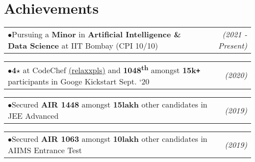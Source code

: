 \documentclass[a4paper,11pt]{article}
\makeatletter
\def\Plus{\texttt{+}}
\newcommand{\resumeSubheading}[4]{
  \vspace{-2pt}\item
    \begin{tabular*}{\textwidth}[t]{l@{\extracolsep{\fill}}r}
      \textbf{#1} & #2 \\
      \textit{\small#3} & \textit{\small #4} \\
    \end{tabular*}\vspace{-7pt}
}
\newcommand{\resumeSubHeadingListStart}{\begin{itemize}[leftmargin=-0pt, label={}]}
\newcommand{\resumeSubHeadingListEnd}{\end{itemize}}
\newcommand{\resumeItemAlt}[2]{
    \begin{tabular*}{0.977\textwidth}{l@{\extracolsep{\fill}}r}
        \tiny{$\bullet$}\hspace{7pt}\small{#1} & \textit{\footnotesize #2} \\
    \end{tabular*}
}
\newcommand{\resumeItemAltListStart}{\begin{adjustwidth}{10.8pt}{}}
\newcommand{\resumeItemAltListEnd}{\end{adjustwidth}}
\makeatother
\begin{document}


  
  \vspace*{25mm}  %

\section{Achievements}
\resumeItemAltListStart
  \resumeItemAlt
  {Pursuing a \textbf{Minor} in \textbf{Artificial Intelligence \& Data Science} at IIT Bombay (CPI 10/10)}{(2021 - Present)}
	\resumeItemAlt
    {\textbf{4\hspace{1pt}$\star$} at CodeChef \href{https://www.codechef.com/users/relaxxpls}{(relaxxpls)} and \textbf{1048\textsuperscript{th}} amongst \textbf{15k\Plus} participants in Googe Kickstart Sept. `20}
    {(2020)}
	\resumeItemAlt
    {Secured \textbf{AIR 1448} amongst \textbf{15lakh} other candidates in JEE Advanced}
    {(2019)}
	\resumeItemAlt
    {Secured \textbf{AIR 1063} amongst \textbf{10lakh} other candidates in AIIMS Entrance Test}
    {(2019)}
\resumeItemAltListEnd
\end{document}
